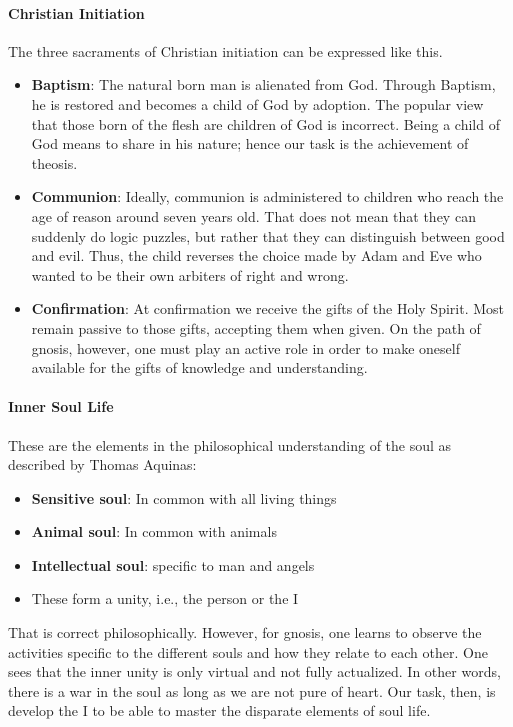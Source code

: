 \paragraph{Christian Initiation}
The three sacraments of Christian initiation can be expressed like this.

\begin{itemize}
\item \textbf{Baptism}: The natural born man is alienated from God. Through Baptism, he is restored and becomes a child
of God by adoption. The popular view that those born of the flesh are children of God is incorrect. Being a child of
God means to share in his nature; hence our task is the achievement of theosis. 
\item \textbf{Communion}: Ideally, communion is administered to children who reach the age of reason around seven years
old. That does not mean that they can suddenly do logic puzzles, but rather that they can distinguish between good and
evil. Thus, the child reverses the choice made by Adam and Eve who wanted to be their own arbiters of right and wrong. 
\item \textbf{Confirmation}: At confirmation we receive the gifts of the Holy Spirit. Most remain passive to those
gifts, accepting them when given. On the path of gnosis, however, one must play an active role in order to make oneself
available for the gifts of knowledge and understanding. 
\end{itemize}
\paragraph{Inner Soul Life}
These are the elements in the philosophical understanding of the soul as described by Thomas Aquinas:

\begin{itemize}
\item \textbf{Sensitive soul}: In common with all living things 
\item \textbf{Animal soul}: In common with animals 
\item \textbf{Intellectual soul}: specific to man and angels 
\item These form a unity, i.e., the person or the I 
\end{itemize}
That is correct philosophically. However, for gnosis, one learns to observe the activities specific to the different
souls and how they relate to each other. One sees that the inner unity is only virtual and not fully actualized. In
other words, there is a war in the soul as long as we are not pure of heart. Our task, then, is develop the I to be
able to master the disparate elements of soul life.

